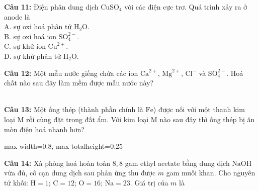 \documentclass[12pt,a4paper]{article}
\begin{document}
\noindent \textbf{Câu 11:} Điện phân dung dịch $\text{CuSO}_4$ với các điện cực trơ. Quá trình xảy ra ở anode là\\
\noindent A. sự oxi hoá phân tử $\text{H}_2\text{O}$.\\
\noindent B. sự oxi hoá ion $\text{SO}_4^{2-}$.\\
\noindent C. sự khử ion $\text{Cu}^{2+}$.\\
\noindent D. sự khử phân tử $\text{H}_2\text{O}$.

\noindent \textbf{Câu 12:} Một mẫu nước giếng chứa các ion $\text{Ca}^{2+}$, $\text{Mg}^{2+}$, $\text{Cl}^{-}$ và $\text{SO}_4^{2-}$. Hoá chất nào sau đây làm mềm được mẫu nước này?\\
\noindent{}\\
\noindent{}

\noindent \textbf{Câu 13:} Một ống thép (thành phần chính là $\text{Fe}$) được nối với một thanh kim loại M rồi cùng đặt trong đất ẩm. Với kim loại M nào sau đây thì ống thép bị ăn mòn điện hoá nhanh hơn?\\
\begin{center}
\begin{adjustbox}{max width=0.8\linewidth, max totalheight=0.25\textheight}
\end{adjustbox}
\end{center}
\noindent{}

\noindent \textbf{Câu 14:} Xà phòng hoá hoàn toàn $8{,}8$ gam ethyl acetate bằng dung dịch $\text{NaOH}$ vừa đủ, cô cạn dung dịch sau phản ứng thu được $m$ gam muối khan. Cho nguyên tử khối: $\text{H} = 1$; $\text{C} = 12$; $\text{O} = 16$; $\text{Na} = 23$. Giá trị của $m$ là\\
\noindent{}
\end{document}
